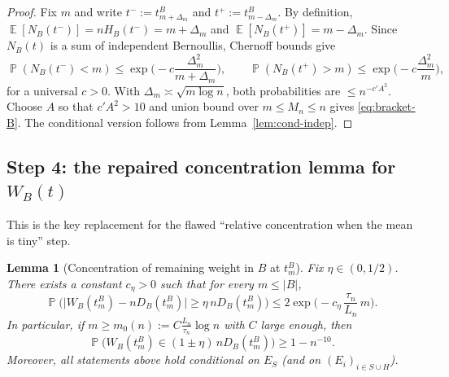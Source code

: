 \documentclass[11pt]{article}
\newtheorem{lem}{Lemma}
\DeclareMathOperator{\E}{\mathbb E}
\DeclareMathOperator{\Pp}{\mathbb P}
\begin{document}
\begin{proof}
Fix $m$ and write $t^-:=t^B_{m+\Delta_m}$ and $t^+:=t^B_{m-\Delta_m}$.
By definition, $\E[N_B(t^-)] = nH_B(t^-)=m+\Delta_m$ and $\E[N_B(t^+)]=m-\Delta_m$.
Since $N_B(t)$ is a sum of independent Bernoullis, Chernoff bounds give
\[
\Pp(N_B(t^-)<m)\le \exp\!\Big(-c\frac{\Delta_m^2}{m+\Delta_m}\Big),
\qquad
\Pp(N_B(t^+)>m)\le \exp\!\Big(-c\frac{\Delta_m^2}{m}\Big),
\]
for a universal $c>0$.
With $\Delta_m\asymp \sqrt{m\log n}$, both probabilities are $\le n^{-c'A^2}$.
Choose $A$ so that $c'A^2>10$ and union bound over $m\le M_n\le n$ gives \eqref{eq:bracket-B}.
The conditional version follows from Lemma~\ref{lem:cond-indep}.
\end{proof}

\subsection*{Step 4: the repaired concentration lemma for $W_B(t)$}

This is the key replacement for the flawed ``relative concentration when the mean is tiny'' step.

\begin{lem}[Concentration of remaining weight in $B$ at $t^B_m$]\label{lem:WB-conc}
Fix $\eta\in(0,1/2)$.
There exists a constant $c_\eta>0$ such that for every $m\le |B|$,
\begin{equation}\label{eq:WB-conc-single}
\Pp\Big(\big|W_B(t^B_m) - nD_B(t^B_m)\big|\ge \eta\,nD_B(t^B_m)\Big)
\le
2\exp\!\Big(-c_\eta\,\frac{\tau_n}{L_n}\,m\Big).
\end{equation}
In particular, if $m\ge m_0(n):=C\frac{L_n}{\tau_n}\log n$ with $C$ large enough, then
\[
\Pp\Big(W_B(t^B_m)\in (1\pm\eta)\,nD_B(t^B_m)\Big)\ge 1-n^{-10}.
\]
Moreover, all statements above hold \emph{conditional on $E_S$} (and on $(E_i)_{i\in S\cup H}$).
\end{lem}
\end{document}
